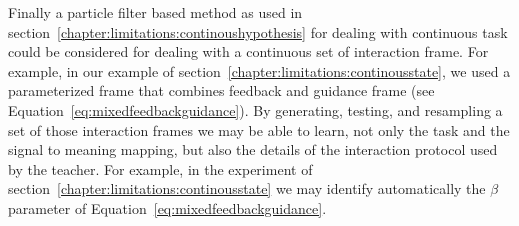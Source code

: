 Finally a particle filter based method as used in section~\ref{chapter:limitations:continoushypothesis} for dealing with continuous task could be considered for dealing with a continuous set of interaction frame. For example, in our example of section~\ref{chapter:limitations:continousstate}, we used a parameterized frame that combines feedback and guidance frame (see Equation~\ref{eq:mixedfeedbackguidance}). By generating, testing, and resampling a set of those interaction frames we may be able to learn, not only the task and the signal to meaning mapping, but also the details of the interaction protocol used by the teacher. For example, in the experiment of section~\ref{chapter:limitations:continousstate} we may identify automatically the $\beta$ parameter of Equation~\ref{eq:mixedfeedbackguidance}.